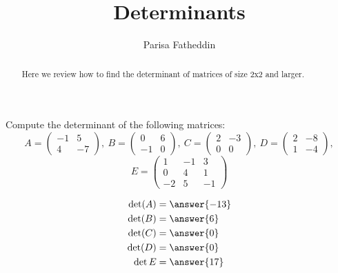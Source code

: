 \documentclass{ximera}
\author{Parisa Fatheddin}
\title{Determinants}
\begin{document}
\begin{abstract}
  Here we review how to find the determinant of matrices of size 2x2 and larger. 
\end{abstract}
\maketitle

\begin{center}
\end{center}
\begin{exercise}
Compute the determinant of the following matrices:
\[
A=
\begin{pmatrix}
-1 & 5\\
4 & -7
\end{pmatrix},\  B = \begin{pmatrix} 0 & 6\\
-1 & 0
\end{pmatrix},\ C= \begin{pmatrix} 2 & -3 \\
0 & 0
\end{pmatrix},\ D = \begin{pmatrix} 2 & -8 \\
1 & -4
\end{pmatrix},
\]
\[
E = \begin{pmatrix}
1 & -1 & 3\\
0 & 4 & 1\\
-2 & 5 & -1
\end{pmatrix}
\]
\begin{prompt}
\begin{align*}
\det(A) &= \answer{-13}\\
\det(B) &= \answer{6}\\
\det(C) &= \answer{0}\\
\det(D) &= \answer{0}\\
\det{E} &= \answer{17}
\end{align*}
\end{prompt}
\end{exercise}
\end{document}
